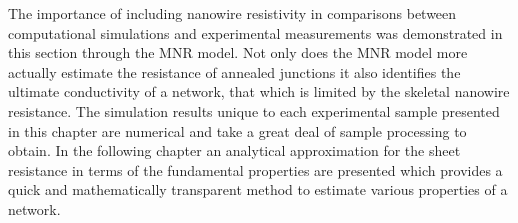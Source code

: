 The importance of including nanowire resistivity in comparisons between computational simulations and experimental measurements was demonstrated in this section through the MNR model. Not only does the MNR model more actually estimate the resistance of annealed junctions it also identifies the ultimate conductivity of a network, that which is limited by the skeletal nanowire resistance. The simulation results unique to each experimental sample presented in this chapter are numerical and take a great deal of sample processing to obtain. In the following chapter an analytical approximation for the sheet resistance in terms of the fundamental properties are presented which provides a quick and mathematically transparent method to estimate various properties of a network.


